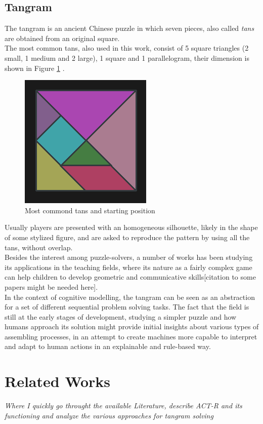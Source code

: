 \documentclass[a4paper,singleside,12pt]{report} %
\begin{document}
	\section{Tangram}
	The tangram is an ancient Chinese puzzle in which seven pieces, also called \textit{tans} are
	obtained from an original square.\\
	The most common tans, also used in this work, consist of 5 square triangles (2 small, 1 medium
	and 2 large), 1 square and 1 parallelogram, their dimension is shown in Figure \ref{fig:tans}
	.\\
	\begin{figure}[h]
		\centering
		\includegraphics{pictures/tan.png}
		\caption[]{Most commond tans and starting position}
		\label{fig:tans}
	\end{figure}
	Usually players are presented with an homogeneous silhouette, likely in the shape of some
	stylized figure, and are asked to reproduce the pattern by using all the tans, without
	overlap.\\
	Besides the interest among puzzle-solvers, a number of works has been studying its applications
	in the teaching fields, where its nature as a fairly complex game can help children to develop
	geometric and communicative skills[citation to some papers might be needed here].\\
	In the context of cognitive modelling, the tangram can be seen as an abstraction for a set of
	different sequential problem solving tasks. The fact that the field is still at the early stages
	of development, studying a simpler puzzle and how humans approach its solution might provide
	initial insights about various types of assembling processes, in an attempt to create machines
	more capable to interpret and adapt to human actions in an explainable and rule-based way. 	
    
    
    \chapter{Related Works}
    \textit{Where I quickly go throught the available Literature, describe ACT-R and its functioning
	and analyze the various approaches for tangram solving}
	
\end{document}
